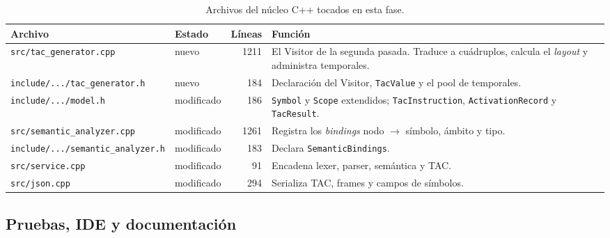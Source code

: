 \documentclass[11pt,a4paper]{article}
\begin{document}
\begin{table}[H]
\centering
\small
\begin{tabular}{@{}L{5.9cm}L{1.9cm}rL{4.5cm}@{}}
\toprule
\textbf{Archivo} & \textbf{Estado} & \textbf{Líneas} & \textbf{Función} \\
\midrule
\texttt{src/tac\_generator.cpp} & nuevo & 1211 &
El Visitor de la segunda pasada. Traduce a cuádruplos, calcula el \emph{layout}
y administra temporales. \\
\texttt{include/.../tac\_generator.h} & nuevo & 184 &
Declaración del Visitor, \texttt{TacValue} y el pool de temporales. \\
\texttt{include/.../model.h} & modificado & 186 &
\texttt{Symbol} y \texttt{Scope} extendidos; \texttt{TacInstruction},
\texttt{ActivationRecord} y \texttt{TacResult}. \\
\texttt{src/semantic\_analyzer.cpp} & modificado & 1261 &
Registra los \emph{bindings} nodo $\rightarrow$ símbolo, ámbito y tipo. \\
\texttt{include/.../semantic\_analyzer.h} & modificado & 183 &
Declara \texttt{SemanticBindings}. \\
\texttt{src/service.cpp} & modificado & 91 &
Encadena lexer, parser, semántica y TAC. \\
\texttt{src/json.cpp} & modificado & 294 &
Serializa TAC, frames y campos de símbolos. \\
\bottomrule
\end{tabular}
\caption{Archivos del núcleo C++ tocados en esta fase.}
\end{table}

\subsection{Pruebas, IDE y documentación}
\end{document}
